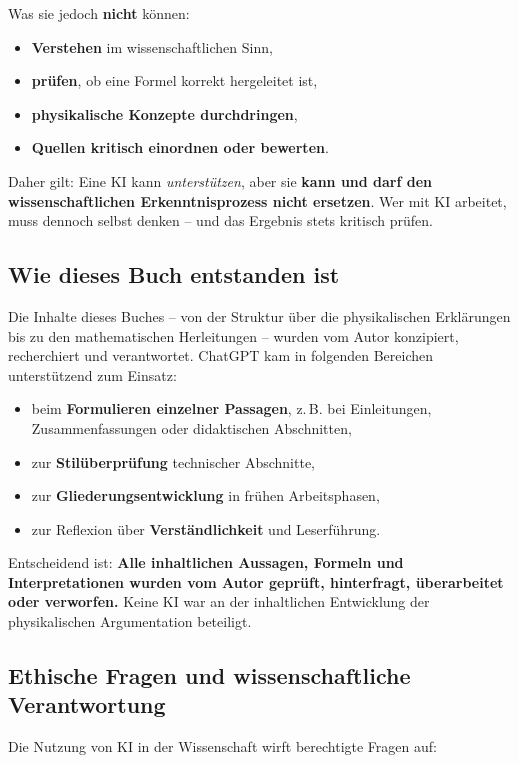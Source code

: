 Was sie jedoch \textbf{nicht} können:
\begin{itemize}
	\item \textbf{Verstehen} im wissenschaftlichen Sinn,
	\item \textbf{prüfen}, ob eine Formel korrekt hergeleitet ist,
	\item \textbf{physikalische Konzepte durchdringen},
	\item \textbf{Quellen kritisch einordnen oder bewerten}.
\end{itemize}

Daher gilt: Eine KI kann \emph{unterstützen}, aber sie \textbf{kann und darf den wissenschaftlichen Erkenntnisprozess nicht ersetzen}. Wer mit KI arbeitet, muss dennoch selbst denken – und das Ergebnis stets kritisch prüfen.

\subsection*{Wie dieses Buch entstanden ist}
Die Inhalte dieses Buches – von der Struktur über die physikalischen Erklärungen bis zu den mathematischen Herleitungen – wurden vom Autor konzipiert, recherchiert und verantwortet. ChatGPT kam in folgenden Bereichen unterstützend zum Einsatz:

\begin{itemize}
	\item beim \textbf{Formulieren einzelner Passagen}, z.\,B. bei Einleitungen, Zusammenfassungen oder didaktischen Abschnitten,
	\item zur \textbf{Stilüberprüfung} technischer Abschnitte,
	\item zur \textbf{Gliederungsentwicklung} in frühen Arbeitsphasen,
	\item zur Reflexion über \textbf{Verständlichkeit} und Leserführung.
\end{itemize}

Entscheidend ist: \textbf{Alle inhaltlichen Aussagen, Formeln und Interpretationen wurden vom Autor geprüft, hinterfragt, überarbeitet oder verworfen.} Keine KI war an der inhaltlichen Entwicklung der physikalischen Argumentation beteiligt.

\subsection*{Ethische Fragen und wissenschaftliche Verantwortung}
Die Nutzung von KI in der Wissenschaft wirft berechtigte Fragen auf:

